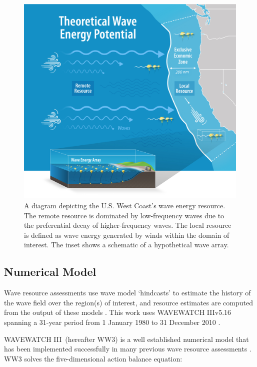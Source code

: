 \begin{figure}[ht]
\centering
\includegraphics[width=\linewidth]{./fig/NREL-WaveGraphic_v06.png}
\caption{A diagram depicting the U.S. West Coast's wave energy resource. The remote resource is dominated by low-frequency waves due to the preferential decay of higher-frequency waves. The local resource is defined as wave energy generated by winds within the domain of interest. The inset shows a schematic of a hypothetical wave array.}
\label{fig:diagram:west-eez}
\end{figure}

\subsection{Numerical Model} \label{sec:method:model}

Wave resource assessments use wave model `hindcasts' to estimate the history of the wave field over the region(s) of interest, and resource estimates are computed from the output of these models \citep{internationalelectrotechnicalcommissionPart101Wave2015}. This work uses WAVEWATCH III\textregistered v5.16 spanning a 31-year period from 1 January 1980 to 31 December 2010 \citep{tolmanDistributedmemoryConceptsWave2002,tolmanwavewatch}.

WAVEWATCH III\textregistered \ (hereafter WW3) is a well established numerical model that has been implemented successfully in many previous wave resource assessments \citep[e.g.,][]{garcia-medinaWaveResourceAssessment2014,hemerRevisedAssessmentAustralia2017,yangWaveModelTest2017}.
WW3 solves the five-dimensional action balance equation:

